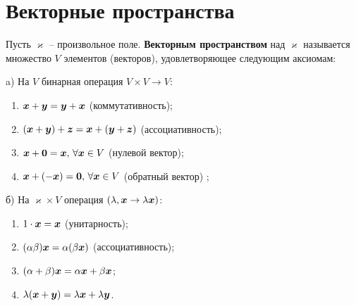 \section{Векторные пространства}

\begin{to_def}
	Пусть $\varkappa$ -- произвольное поле. \textbf{Векторным пространством} над $\varkappa$ называется множество $V$ элементов (векторов), удовлетворяющее следующим аксиомам:

	\noindent
	a) На $V$ бинарная операция $V \times V \rightarrow V$:
	\begin{enumerate}[label = \Roman*.]
		\item $\mbox{\boldmath $x$} + \mbox{\boldmath $y$} = \mbox{\boldmath $y$} + \mbox{\boldmath $x$}$ (коммутативность);
		\item $(\mbox{\boldmath $x$} + \mbox{\boldmath $y$}) + \mbox{\boldmath $z$} = \mbox{\boldmath $x$} + (\mbox{\boldmath $y$} + \mbox{\boldmath $z$})$ (ассоциативность);
		\item $\mbox{\boldmath $x$} + \mbox{\boldmath $0$} = \mbox{\boldmath $x$}, \, \forall \mbox{\boldmath $x$}\in V$ (нулевой вектор);
		\item $\mbox{\boldmath $x$} + (-\mbox{\boldmath $x$}) = \mbox{\boldmath $0$}, \, \forall \mbox{\boldmath $x$} \in V$ (обратный вектор) ;
	\end{enumerate}
	б) На $\varkappa \times V$ операция $(\lambda, \mbox{\boldmath $x$} \rightarrow \lambda \mbox{\boldmath $x$})$:
	\begin{enumerate}[label = \Roman*., start = 5]
		\item $1 \cdot \mbox{\boldmath $x$} = \mbox{\boldmath $x$}$ (унитарность);
		\item $(\alpha \beta) \mbox{\boldmath $x$} = \alpha  (\beta \mbox{\boldmath $x$})$ (ассоциативность);
		\item $(\alpha + \beta) \mbox{\boldmath $x$} = \alpha \mbox{\boldmath $x$} + \beta \mbox{\boldmath $x$}$;
		\item $\lambda (\mbox{\boldmath $x$} +\mbox{\boldmath $y$}) = \lambda \mbox{\boldmath $x$} + \lambda \mbox{\boldmath $y$}$.
	\end{enumerate}
\end{to_def}